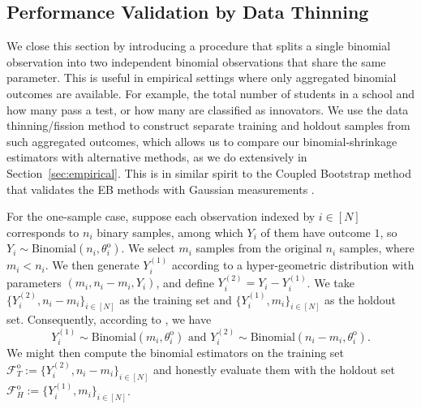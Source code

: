 \documentclass[12pt,letterpaper]{article}
\begin{document}
\subsection{Performance Validation by Data Thinning}\label{subsubsec:data-thinning}
We close this section by introducing a procedure that splits a single binomial observation into two independent binomial observations that share the same parameter. This is useful in empirical settings where only aggregated binomial outcomes are available. For example, the total number of students in a school and how many pass a test, or how many are classified as innovators. We use the data thinning/fission method \citep{neufeld2024data,leiner2025data} to construct separate training and holdout samples from such aggregated outcomes, which allows us to compare our binomial-shrinkage estimators with alternative methods, as we do extensively in Section~\ref{sec:empirical}. This is in similar spirit to the Coupled Bootstrap method that validates the EB methods with Gaussian measurements \citep{chen2022empirical}.

For the one-sample case, suppose each observation indexed by $i\in[N]$ corresponds to $n_i$ binary samples, among which $Y_i$ of them have outcome $1$, so $Y_i\sim\mathrm{Binomial}(n_i,\theta_i^{\mathrm{o}})$. We select $m_i$ samples from the original $n_i$ samples, where $m_i < n_i$. We then generate $Y_i^{(1)}$ according to a hyper-geometric distribution with parameters $(m_i, n_i - m_i, Y_i)$, and define $Y_i^{(2)} = Y_i - Y_i^{(1)}$. We take $\{Y_i^{(2)},n_i - m_i\}_{i\in[N]}$ as the training set and $\{Y_i^{(1)}, m_i\}_{i\in[N]}$ as the holdout set. Consequently, according to \citet{neufeld2024data,leiner2025data}, we have 
$$Y_i^{(1)}\sim\mathrm{Binomial}(m_i,\theta_i^{\mathrm{o}}) \mbox{ and } Y_i^{(2)}\sim\mathrm{Binomial}(n_i - m_i,\theta_i^{\mathrm{o}}).$$ 
We might then compute the binomial estimators on the training set $\mathcal{F}_T^{\mathrm{o}}:=\{Y_i^{(2)},n_i - m_i\}_{i\in[N]}$ and honestly evaluate them with the holdout set $\mathcal{F}_H^{\mathrm{o}}:=\{Y_i^{(1)}, m_i\}_{i\in[N]}$. 
\end{document}
